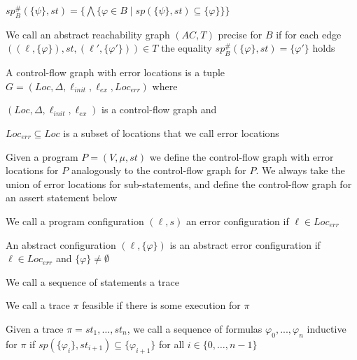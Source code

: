 \documentclass[landscape, a4paper]{article}
\begin{document}
\begin{minipage}[t]{0.2\linewidth}
\begin{betterlist}
\begin{betterlist}
			\item $sp^\#_B(\{ \psi \} , st) = \{\bigwedge \{\varphi \in B \mid sp(\{ \psi \}, st) \subseteq \{ \varphi \}\}\}$
		\end{betterlist}
		\item We call an abstract reachability graph $(AC, T)$ \alert{precise for $B$} if for each edge $((\ell, \{\varphi\}), st, (\ell', \{\varphi'\})) \in T$ the equality $sp^\#_B(\{\varphi\}, st) = \{\varphi'\}$ holds
	\end{betterlist}
	\begin{betterlist}
		\item \color{orange}A \alert{control-flow graph with error locations} is a tuple $G = (Loc, \Delta, \ell_{init}, \ell_{ex}, Loc_{err})$ where
		\begin{betterlist}
			\item $(Loc, \Delta, \ell_{init}, \ell_{ex})$ is a control-flow graph and
			\item $Loc_{err} \subseteq Loc$ is a subset of locations that we call \alert{error locations}
		\end{betterlist}\color{black}
		\item Given a program $P = (V, \mu, st)$ we define the \alert{control-flow graph with error locations for $P$} analogously to the control-flow graph for $P$. We always take the union of error locations for sub-statements, and define the control-flow graph for an assert statement below
		\begin{betterlist}
			\item {}
		\end{betterlist}
		\item \color{orange}We call a program configuration $(\ell, s)$ an \alert{error configuration} if $\ell \in Loc_{err}$\color{black}
		\item \color{orange}An abstract configuration $(\ell, \{\varphi\})$ is an \alert{abstract error configuration} if $\ell \in Loc_{err}$ and $\{\varphi\}\ne \emptyset$\color{black}
		\item \color{orange}We call a sequence of statements a \alert{trace}\color{black}
		\begin{betterlist}
			\item We call a trace $\pi$ \alert{feasible} if there is some execution for $\pi$
		\end{betterlist}
		\item \color{orange}Given a trace $\pi = st_1, \ldots, st_n$, we call a \alert{sequence of formulas} $\varphi_0, . . . , \varphi_n$ \alert{inductive for $\pi$} if $sp(\{\varphi_i\}, st_{i+1}) \subseteq \{\varphi_{i+1}\}$ for all $i \in \{0, \ldots, n−1\}$\color{black} %

\end{betterlist}
\end{minipage}
\end{document}
